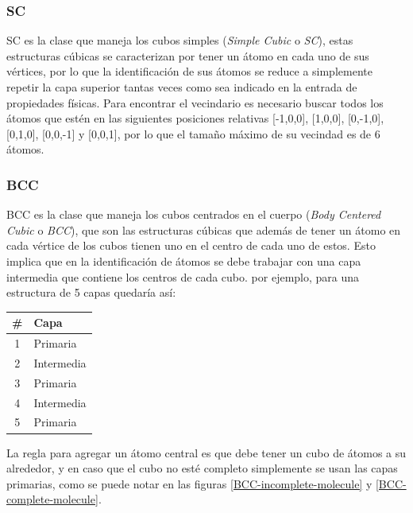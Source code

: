 \subsubsection{SC}
SC es la clase que maneja los cubos simples (\emph{Simple Cubic} o \emph{SC}), estas estructuras cúbicas se caracterizan por tener un átomo en cada uno de sus vértices, por lo que la identificación de sus átomos se reduce a simplemente repetir la capa superior tantas veces como sea indicado en la entrada de propiedades físicas. Para encontrar el vecindario es necesario buscar todos los átomos que estén en las siguientes posiciones relativas [-1,0,0], [1,0,0], [0,-1,0], [0,1,0], [0,0,-1] y [0,0,1], por lo que el tamaño máximo de su vecindad es de 6 átomos.

\subsubsection{BCC}
BCC es la clase que maneja los cubos centrados en el cuerpo (\emph{Body Centered Cubic} o \emph{BCC}), que son las estructuras cúbicas que además de tener un átomo en cada vértice de los cubos tienen uno en el centro de cada uno de estos. Esto implica que en la identificación de átomos se debe trabajar con una capa intermedia que contiene los centros de cada cubo. por ejemplo, para una estructura de 5 capas quedaría así:
\begin{center}
  \begin{tabular}{ c | l }
    \# & Capa \\
    \hline
    1 & Primaria \\
    2 & Intermedia \\
    3 & Primaria \\
    4 & Intermedia \\
    5 & Primaria \\
    \hline
  \end{tabular}
\end{center}

La regla para agregar un átomo central es que debe tener un cubo de átomos a su alrededor, y en caso que el cubo no esté completo simplemente se usan las capas primarias, como se puede notar en las figuras \ref{BCC-incomplete-molecule} y \ref{BCC-complete-molecule}.

